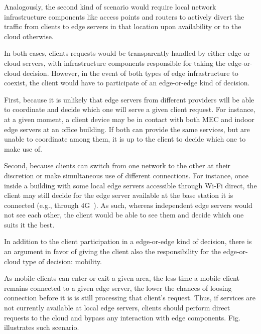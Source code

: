 Analogously, the second kind of scenario would require local network infrastructure components like access points and routers to actively divert the traffic from clients to edge servers in that location upon availability or to the cloud otherwise.

In both cases, clients requests would be transparently handled by either edge or cloud servers, with infrastructure components responsible for taking the edge-or-cloud decision. However, in the event of both types of edge infrastructure to coexist, the client would have to participate of an edge-or-edge kind of decision.

First, because it is unlikely that edge servers from different providers will be able to coordinate and decide which one will serve a given client request. For instance, at a given moment, a client device may be in contact with both MEC and indoor edge servers at an office building. If both can provide the same services, but are unable to coordinate among them, it is up to the client to decide which one to make use of. 

Second, because clients can switch from one network to the other at their discretion or make simultaneous use of different connections. For instance, once inside a building with some local edge servers accessible through Wi-Fi direct, the client may still decide for the edge server available at the base station it is connected (e.g., through 4G~\cite{4G}). As such, whereas independent edge servers would not see each other, the client would be able to see them and decide which one suits it the best.

In addition to the client participation in a edge-or-edge kind of decision, there is an argument in favor of giving the client also the responsibility for the edge-or-cloud type of decision: mobility. 

As mobile clients can enter or exit a given area, the less time a mobile client remains connected to a given edge server, the lower the chances of loosing connection before it is is still processing that client's request. Thus, if services are not currently available at local edge servers, clients should perform direct requests to the cloud and bypass any interaction with edge components. Fig. illustrates such scenario.

